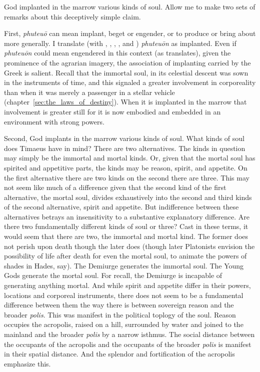 God implanted in the marrow various kinds of soul. Allow me to make two sets of remarks about this deceptively simple claim.

First, \emph{phuteuō} can mean implant, beget or engender, or to produce or bring about more generally. I translate (with \citealt[271]{Archer-Hind:1888qd}, \citealt[293]{Cornford:1935fk}, \citealt[70]{Lee:2008ca}, \citealt[77]{Taylor:1929ov} \citealt[73]{Waterfield:2003gs}, and \citealt[67]{Zeyl:2000cs}) \emph{phuteuōn} as implanted. Even if \emph{phuteuōn} could mean engendered in this context (as \citealt[191--3]{Bury:1929jb} translates), given the prominence of the agrarian imagery, the association of implanting carried by the Greek is salient. Recall that the immortal soul, in its celestial descent was sown in the instruments of time, and this signaled a greater involvement in corporeality than when it was merely a passenger in a stellar vehicle (chapter~\ref{sec:the_laws_of_destiny}). When it is implanted in the marrow that involvement is greater still for it is now embodied and embedded in an environment with strong powers.

Second, God implants in the marrow various kinds of soul. What kinds of soul does Timaeus have in mind? There are two alternatives. The kinds in question may simply be the immortal and mortal kinds. Or, given that the mortal soul has spirited and appetitive parts, the kinds may be reason, spirit, and appetite. On the first alternative there are two kinds on the second there are three. This may not seem like much of a difference given that the second kind of the first alternative, the mortal soul, divides exhaustively into the second and third kinds of the second alternative, spirit and appetite. But indifference between these alternatives betrays an insensitivity to a substantive explanatory difference. Are there two fundamentally different kinds of soul or three? Cast in these terms, it would seem that there are two, the immortal and mortal kind. The former does not perish upon death though the later does (though later Platonists envision the possibility of life after death for even the mortal soul, to animate the powers of shades in Hades, say). The Demiurge generates the immortal soul. The Young Gods generate the mortal soul. For recall, the Demiurge is incapable of generating anything mortal. And while spirit and appetite differ in their powers, locations and corporeal instruments, there does not seem to be a fundamental difference between them the way there is between sovereign reason and the broader \emph{polis}. This was manifest in the political toplogy of the soul. Reason occupies the acropolis, raised on a hill, surrounded by water and joined to the mainland and the broader \emph{polis} by a narrow isthmus. The social distance between the occupants of the acropolis and the occupants of the broader \emph{polis} is manifest in their spatial distance. And the splendor and fortification of the acropolis emphasize this. 

